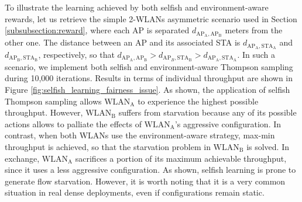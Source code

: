 \documentclass[preprint,12pt]{elsarticle}
\begin{document}
To illustrate the learning achieved by both selfish and environment-aware rewards, let us retrieve the simple 2-WLANs asymmetric scenario used in Section \ref{subsubsection:reward}, where each AP is separated $d_{\text{AP}_\text{A},\text{AP}_\text{B}}$ meters from the other one. The distance between an AP and its associated STA is $d_{\text{AP}_\text{A},\text{STA}_\text{A}}$ and $d_{\text{AP}_\text{B},\text{STA}_\text{B}}$, respectively, so that $d_{\text{AP}_\text{A},\text{AP}_\text{B}} > d_{\text{AP}_B,\text{STA}_\text{B}} > d_{\text{AP}_\text{A},\text{STA}_\text{A}}$. In such a scenario, we implement both selfish and environment-aware Thompson sampling during 10,000 iterations. Results in terms of individual throughput are shown in Figure \ref{fig:selfish_learning_fairness_issue}. As shown, the application of selfish Thompson sampling allows $\text{WLAN}_\text{A}$ to experience the highest possible throughput. However, $\text{WLAN}_\text{B}$ suffers from starvation because any of its possible actions allows to palliate the effects of $\text{WLAN}_\text{A}$'s aggressive configuration. In contrast, when both WLANs use the environment-aware strategy, max-min throughput is achieved, so that the starvation problem in $\text{WLAN}_\text{B}$ is solved. In exchange, $\text{WLAN}_\text{A}$ sacrifices a portion of its maximum achievable throughput, since it uses a less aggressive configuration. As shown, selfish learning is prone to generate flow starvation. However, it is worth noting that it is a very common situation in real dense deployments, even if configurations remain static. 	
\end{document}
